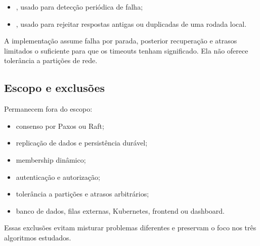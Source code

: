 \begin{itemize}
    \item {}, usado para detecção periódica de falha;
    \item {}, usado para rejeitar respostas antigas ou duplicadas de uma rodada local.
\end{itemize}

A implementação assume falha por parada, posterior recuperação e atrasos limitados o suficiente para que os timeouts tenham significado. Ela não oferece tolerância a partições de rede.

\subsection{Escopo e exclusões}

Permanecem fora do escopo:

\begin{itemize}
    \item consenso por Paxos ou Raft;
    \item replicação de dados e persistência durável;
    \item membership dinâmico;
    \item autenticação e autorização;
    \item tolerância a partições e atrasos arbitrários;
    \item banco de dados, filas externas, Kubernetes, frontend ou dashboard.
\end{itemize}

Essas exclusões evitam misturar problemas diferentes e preservam o foco nos três algoritmos estudados.
